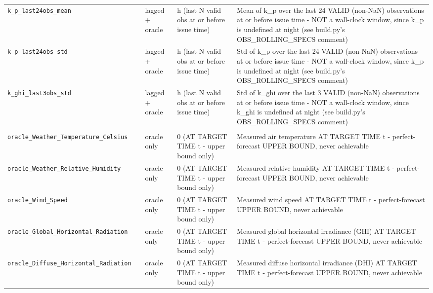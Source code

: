 \begin{table}[t]
\begin{tabular}{llll p{6.5cm}}
    \texttt{k\_p\_last24obs\_mean} &  & lagged + oracle & h (last N valid obs at or before issue time) & Mean of k\_p over the last 24 VALID (non-NaN) observations at or before issue time - NOT a wall-clock window, since k\_p is undefined at night (see build.py's OBS\_ROLLING\_SPECS comment) \\
    \texttt{k\_p\_last24obs\_std} &  & lagged + oracle & h (last N valid obs at or before issue time) & Std of k\_p over the last 24 VALID (non-NaN) observations at or before issue time - NOT a wall-clock window, since k\_p is undefined at night (see build.py's OBS\_ROLLING\_SPECS comment) \\
    \texttt{k\_ghi\_last3obs\_std} &  & lagged + oracle & h (last N valid obs at or before issue time) & Std of k\_ghi over the last 3 VALID (non-NaN) observations at or before issue time - NOT a wall-clock window, since k\_ghi is undefined at night (see build.py's OBS\_ROLLING\_SPECS comment) \\
    \addlinespace
    \multicolumn{5}{l}{\textit{oracle weather (5 features)}} \\
    \texttt{oracle\_Weather\_Temperature\_Celsius} &  & oracle only & 0 (AT TARGET TIME t - upper bound only) & Measured air temperature AT TARGET TIME t - perfect-forecast UPPER BOUND, never achievable \\
    \texttt{oracle\_Weather\_Relative\_Humidity} &  & oracle only & 0 (AT TARGET TIME t - upper bound only) & Measured relative humidity AT TARGET TIME t - perfect-forecast UPPER BOUND, never achievable \\
    \texttt{oracle\_Wind\_Speed} &  & oracle only & 0 (AT TARGET TIME t - upper bound only) & Measured wind speed AT TARGET TIME t - perfect-forecast UPPER BOUND, never achievable \\
    \texttt{oracle\_Global\_Horizontal\_Radiation} &  & oracle only & 0 (AT TARGET TIME t - upper bound only) & Measured global horizontal irradiance (GHI) AT TARGET TIME t - perfect-forecast UPPER BOUND, never achievable \\
    \texttt{oracle\_Diffuse\_Horizontal\_Radiation} &  & oracle only & 0 (AT TARGET TIME t - upper bound only) & Measured diffuse horizontal irradiance (DHI) AT TARGET TIME t - perfect-forecast UPPER BOUND, never achievable \\
    \bottomrule
  \end{tabular}
\end{table}
